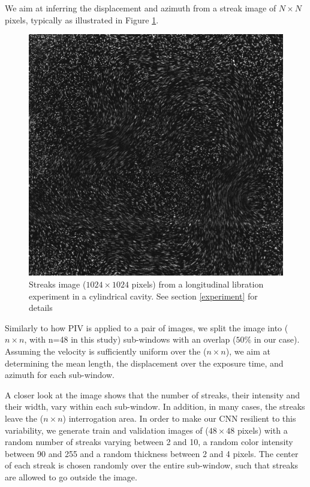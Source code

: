\documentclass{svjour3}                     %
\begin{document}
We aim at inferring the displacement and azimuth from a streak image of $N \times N$ pixels, typically as illustrated in Figure \ref{fig:expImage}.

\begin{figure}
	\includegraphics[width=\textwidth]{figs/figure0.jpg}
	\caption{Streaks image ($1024\times1024$ pixels) from a longitudinal libration experiment in a cylindrical cavity. See section \ref{experiment} for details}
	\label{fig:expImage}
\end{figure}
Similarly to how PIV is applied to a pair of images, we split the image into ($n \times n$, with n=48 in this study) sub-windows with an overlap ($50\%$ in our case). Assuming the velocity is sufficiently uniform over the ($n \times n$), we aim at determining the mean length, the displacement over the exposure time, and azimuth for each sub-window. 

A closer look at the image shows that the number of streaks, their intensity and their width, vary within each sub-window. In addition, in many cases, the streaks leave the ($n \times n$) interrogation area. In order to make our CNN resilient to this variability, we generate train and validation images of ($48 \times 48$ pixels) with a random number of streaks varying between 2 and 10, a random color intensity between 90 and 255 and a random thickness between 2 and 4 pixels. The center of each streak is chosen randomly over the entire sub-window, such that streaks are allowed to go outside the image.
\end{document}
